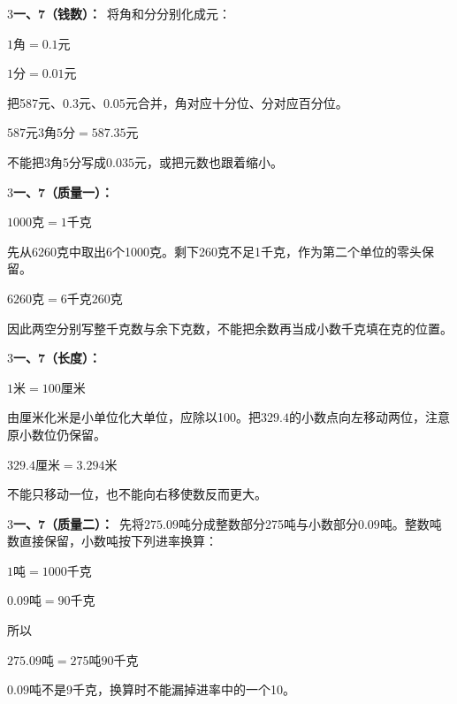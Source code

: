 \documentclass[multi=snippet,border={5bp 20bp 5bp 5bp}]{standalone}
\newenvironment{snippet}[3]{\begin{minipage}{#1bp}\color{answerred}\fontsize{#2}{#3}\selectfont\raggedright}{\end{minipage}}
\begin{document}
\begin{snippet}{505}{11.5}{14}\begin{multicols}{3}\raggedcolumns \textbf{一、7（钱数）：}\ 将角和分分别化成元：\par\noindent\(\displaystyle 1\text{角}=0.1\text{元}\)\allowbreak \par \noindent\(\displaystyle 1\text{分}=0.01\text{元}\)\allowbreak \par 把587元、\(0.3\)\allowbreak 元、\(0.05\)\allowbreak 元合并，角对应十分位、分对应百分位。\par\noindent\(\displaystyle 587\text{元}3\text{角}5\text{分}=587.35\text{元}\)\allowbreak \par 不能把3角5分写成\(0.035\)\allowbreak 元，或把元数也跟着缩小。\end{multicols}\end{snippet}
\begin{snippet}{505}{11.5}{14}\begin{multicols}{3}\raggedcolumns \textbf{一、7（质量一）：}\ \par\noindent\(\displaystyle 1000\text{克}=1\text{千克}\)\allowbreak \par 先从6260克中取出6个1000克。剩下260克不足1千克，作为第二个单位的零头保留。\par\noindent\(\displaystyle 6260\text{克}=6\text{千克}260\text{克}\)\allowbreak \par 因此两空分别写整千克数与余下克数，不能把余数再当成小数千克填在克的位置。\end{multicols}\end{snippet}
\begin{snippet}{505}{11.5}{14}\begin{multicols}{3}\raggedcolumns \textbf{一、7（长度）：}\ \par\noindent\(\displaystyle 1\text{米}=100\text{厘米}\)\allowbreak \par 由厘米化米是小单位化大单位，应除以100。把\(329.4\)\allowbreak 的小数点向左移动两位，注意原小数位仍保留。\par\noindent\(\displaystyle 329.4\text{厘米}=3.294\text{米}\)\allowbreak \par 不能只移动一位，也不能向右移使数反而更大。\end{multicols}\end{snippet}
\begin{snippet}{505}{11.5}{14}\begin{multicols}{3}\raggedcolumns \textbf{一、7（质量二）：}\ 先将\(275.09\)\allowbreak 吨分成整数部分275吨与小数部分\(0.09\)\allowbreak 吨。整数吨数直接保留，小数吨按下列进率换算：\par\noindent\(\displaystyle 1\text{吨}=1000\text{千克}\)\allowbreak \par \noindent\(\displaystyle 0.09\text{吨}=90\text{千克}\)\allowbreak \par 所以\par\noindent\(\displaystyle 275.09\text{吨}=275\text{吨}90\text{千克}\)\allowbreak \par\(0.09\)\allowbreak 吨不是9千克，换算时不能漏掉进率中的一个10。\end{multicols}\end{snippet}
\end{document}
